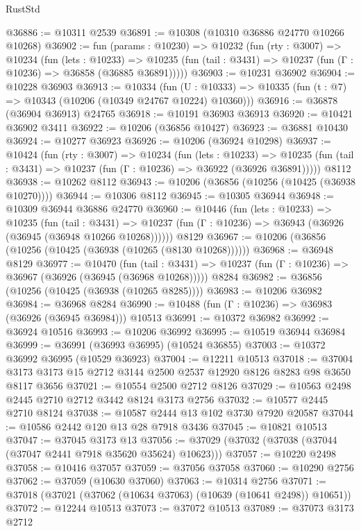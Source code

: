 \begin{lexlean}{RustStd}
\begin{coremodule}
@36886 := @10311 @2539
@36891 := @10308 (@10310 @36886 @24770 @10266 @10268)
@36902 := fun (params : @10230) =>
  @10232
    (fun (rty : @3007) =>
    @10234
      (fun (lets : @10233) =>
      @10235 (fun (tail : @3431) => @10237 (fun (Γ : @10236) => @36858 (@36885 @36891)))))
@36903 := @10231 @36902
@36904 := @10228 @36903
@36913 := @10334
    (fun (U : @10333) => @10335 (fun (t : @7) => @10343 (@10206 (@10349 @24767 @10224) @10360)))
@36916 := @36878 (@36904 @36913) @24765
@36918 := @10191 @36903 @36913
@36920 := @10421 @36902 @3411
@36922 := @10206 (@36856 @10427)
@36923 := @36881 @10430
@36924 := @10277 @36923
@36926 := @10206 (@36924 @10298)
@36937 := @10424
    (fun (rty : @3007) =>
    @10234
      (fun (lets : @10233) =>
      @10235 (fun (tail : @3431) => @10237 (fun (Γ : @10236) => @36922 (@36926 @36891)))))
    @8112
@36938 := @10262 @8112
@36943 := @10206 (@36856 (@10256 (@10425 (@36938 @10270))))
@36944 := @10306 @8112
@36945 := @10305 @36944
@36948 := @10309 @36944 @36886 @24770
@36960 := @10446
    (fun (lets : @10233) =>
    @10235
      (fun (tail : @3431) =>
      @10237 (fun (Γ : @10236) => @36943 (@36926 (@36945 (@36948 @10266 @10268))))))
    @8129
@36967 := @10206 (@36856 (@10256 (@10425 (@36938 (@10265 (@8130 @10268))))))
@36968 := @36948 @8129
@36977 := @10470
    (fun (tail : @3431) => @10237 (fun (Γ : @10236) => @36967 (@36926 (@36945 (@36968 @10268)))))
    @8284
@36982 := @36856 (@10256 (@10425 (@36938 (@10265 @8285))))
@36983 := @10206 @36982
@36984 := @36968 @8284
@36990 := @10488 (fun (Γ : @10236) => @36983 (@36926 (@36945 @36984))) @10513
@36991 := @10372 @36982
@36992 := @36924 @10516
@36993 := @10206 @36992
@36995 := @10519 @36944 @36984
@36999 := @36991 (@36993 @36995) (@10524 @36855)
@37003 := @10372 @36992 @36995 (@10529 @36923)
@37004 := @12211 @10513
@37018 := @37004 @3173 @3173 @15 @2712 @3144 @2500 @2537 @12920 @8126 @8283 @98 @3650 @8117 @3656
@37021 := @10554 @2500 @2712 @8126
@37029 := @10563 @2498 @2445 @2710 @2712 @3442 @8124 @3173 @2756
@37032 := @10577 @2445 @2710 @8124
@37038 := @10587 @2444 @13 @102 @3730 @7920 @20587
@37044 := @10586 @2442 @120 @13 @28 @7918 @3436
@37045 := @10821 @10513
@37047 := @37045 @3173 @13
@37056 := @37029 (@37032 (@37038 (@37044 (@37047 @2441 @7918 @35620 @35624) @10623)))
@37057 := @10220 @2498
@37058 := @10416 @37057
@37059 := @37056 @37058
@37060 := @10290 @2756
@37062 := @37059 (@10630 @37060)
@37063 := @10314 @2756
@37071 := @37018 (@37021 (@37062 (@10634 @37063) (@10639 (@10641 @2498)) @10651))
@37072 := @12244 @10513
@37073 := @37072 @10513
@37089 := @37073
    @3173
    @2712

\end{coremodule}
\end{lexlean}
